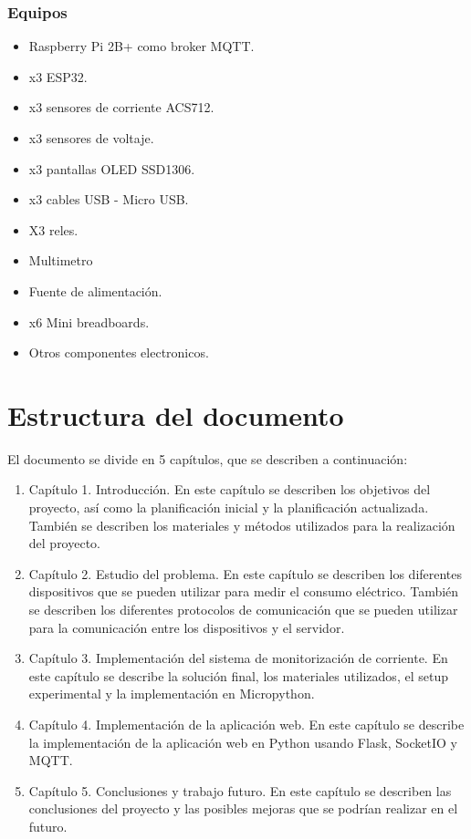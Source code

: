 \begin{titlepage}
\subsubsection{Equipos}
\begin{itemize}
	\item Raspberry Pi 2B+ como broker MQTT.
	\item x3 ESP32.
	\item x3 sensores de corriente ACS712.
	\item x3 sensores de voltaje. 
	\item x3 pantallas OLED SSD1306.
	\item x3 cables USB - Micro USB.
	\item X3 reles.
	\item Multimetro
	\item Fuente de alimentación.
	\item x6 Mini breadboards.
	\item Otros componentes electronicos.
\end{itemize}

\section{Estructura del documento}
El documento se divide en 5 capítulos, que se describen a continuación:
\begin{enumerate}
\item Capítulo 1. Introducción. En este capítulo se describen los objetivos del proyecto, así como la planificación inicial y la planificación actualizada. También se describen los materiales y métodos utilizados para la realización del proyecto. 
\item Capítulo 2. Estudio del problema. En este capítulo se describen los diferentes dispositivos que se pueden utilizar para medir el consumo eléctrico. También se describen los diferentes protocolos de comunicación que se pueden utilizar para la comunicación entre los dispositivos y el servidor.
\item Capítulo 3. Implementación del sistema de monitorización de corriente. En este capítulo se describe la solución final, los materiales utilizados, el setup experimental y la implementación en Micropython.
\item Capítulo 4. Implementación de la aplicación web. En este capítulo se describe la implementación de la aplicación web en Python usando Flask, SocketIO y MQTT.
\item Capítulo 5. Conclusiones y trabajo futuro. En este capítulo se describen las conclusiones del proyecto y las posibles mejoras que se podrían realizar en el futuro.
\end{enumerate}

\end{titlepage}
